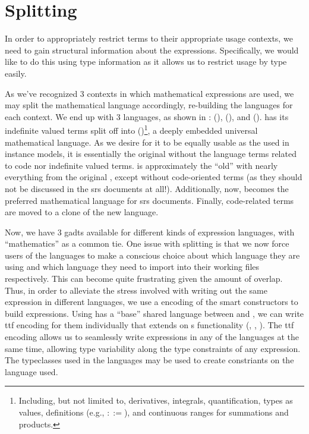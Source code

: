 \section{Splitting}
\label{chap:lang-division:sec:splitting}

In order to appropriately restrict terms to their appropriate usage contexts, we
need to gain structural information about the expressions. Specifically, we
would like to do this using type information as it allows us to restrict usage
by type easily.

\languageDivision{}

As we've recognized 3 contexts in which mathematical expressions are used, we
may split the mathematical language accordingly, re-building the languages for
each context. We end up with 3 languages, as shown in :
\Expr{} (), \ModelExpr{}
(), and \CodeExpr{} ().
\Expr{} has its indefinite valued terms split off into \ModelExpr{}
()\footnote{Including, but not limited to,
derivatives, integrals, quantification, types as values, definitions (e.g.,
\(::=\)), and continuous ranges for summations and products.}, a deeply embedded
universal mathematical language. As we desire for it to be equally usable as the
\Expr{} used in instance models, it is essentially the original \Expr{} without
the language terms related to code nor indefinite valued terms. \ModelExpr{} is
approximately the ``old'' \Expr{} with nearly everything from the original
\Expr{}, except without code-oriented terms (as they should not be discussed in
the \acs{srs} documents at all!). Additionally, now, \ModelExpr{} becomes the
preferred mathematical language for \acs{srs} documents. Finally, code-related
terms are moved to a clone of the new \Expr{} language.

Now, we have 3 \acsp{gadt} available for different kinds of expression
languages, with ``mathematics'' as a common tie. One issue with splitting is
that we now force users of the languages to make a conscious choice about which
language they are using and which language they need to import into their
working files respectively. This can become quite frustrating given the amount
of overlap. Thus, in order to alleviate the stress involved with writing out the
same expression in different languages, we use a  encoding of the smart
constructors to build expressions. Using \Expr{} has a ``base'' shared language
between \ModelExpr{} and \CodeExpr{}, we can write \acs{ttf} encoding for them
individually that extends on \Expr{}s functionality
(, ,
). The \acs{ttf} encoding allows us to seamlessly
write expressions in any of the languages at the same time, allowing type
variability along the type constraints of any expression. The typeclasses used
in the languages may be used to create constriants on the language used.

